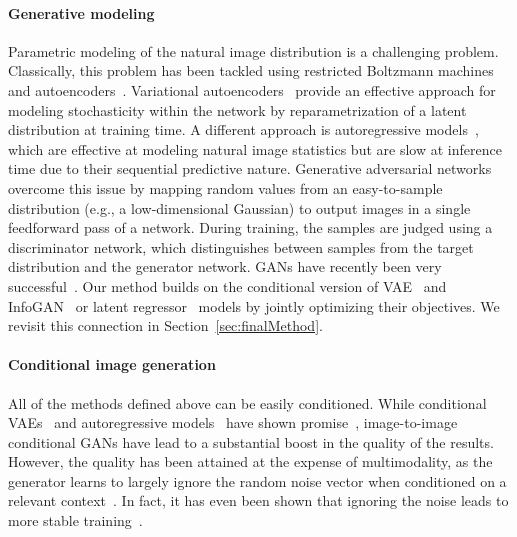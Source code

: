 \documentclass{article}
\begin{document}
\paragraph{Generative modeling}
Parametric modeling of the natural image distribution is a challenging problem. Classically, this problem has been tackled using restricted Boltzmann machines~\citep{smolensky1986information} and autoencoders~\citep{hinton2006reducing,vincent2008extracting}. 
Variational autoencoders~\citep{kingma2013auto} provide an effective approach for modeling stochasticity within the network by reparametrization of a latent distribution at training time.
A different approach is autoregressive models~\citep{efros1999texture,van2016pixel,oord2016conditional}, which are effective at modeling natural image statistics but are slow at inference time due to their sequential predictive nature.
Generative adversarial networks~\citep{goodfellow2014generative} overcome this issue by mapping random values from an easy-to-sample distribution (e.g., a low-dimensional Gaussian) to output images in a single feedforward pass of a network. During training, the samples are judged using a discriminator network, which distinguishes between samples from the target distribution and the generator network.
GANs have recently been very successful~\citep{denton2015deep,radford2015unsupervised,donahue2016adversarial,dumoulin2016adversarially,reed2016generative,zhao2016energy,zhu2016generative,arjovsky2017wgan,zhang2016stackgan,xi2016infogan}. Our method builds on the conditional version of VAE~\citep{kingma2013auto} and InfoGAN~\citep{xi2016infogan} or latent regressor~\citep{donahue2016adversarial,dumoulin2016adversarially} models by jointly optimizing their objectives. We revisit this connection in Section~\ref{sec:finalMethod}.

\paragraph{Conditional image generation} All of the methods defined above can be easily conditioned. While conditional VAEs~\citep{sohn2015cvae} and
autoregressive models~\citep{oord2016conditional,van2016pixel} have shown promise~\citep{walker2016uncertain,xue2016visual,guadarrama2017pixcolor}, image-to-image conditional GANs have lead to a substantial boost in the quality of the results. However, the quality has been attained at the expense of multimodality, as the generator learns to largely ignore the random noise vector when conditioned on a relevant context~\citep{pathakCVPR16context,sangkloy2017scribbler,xian2017texturegan,yang2016high,isola2016image,zhu2017unpaired}. 
In fact, it has even been shown that ignoring the noise leads to more stable training~\citep{mathieu2015deep,pathakCVPR16context,isola2016image}.
\end{document}
